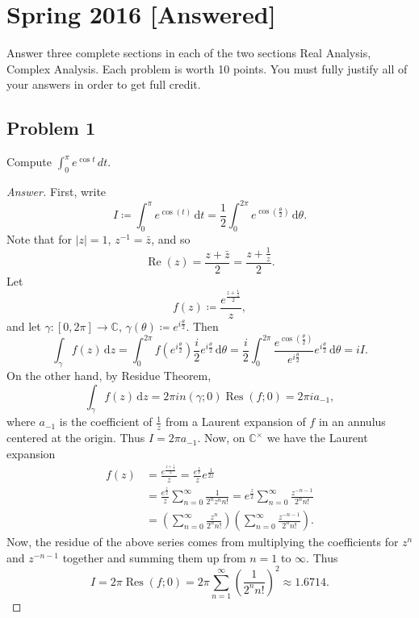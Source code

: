 \documentclass[12pt]{article}
\newcommand{\cx}{\mathbb{C}}
\newcommand\inv[1]{#1^{-1}}
\newcommand\paren[1]{\left( #1 \right)}
\newcommand{\abs}[1]{\left| #1 \right|}
\renewcommand{\i}[4]{\int_{#1}^{#2} {#3} \, \mathrm{d} {#4} }
\theoremstyle{definition}
\DeclareMathOperator\Res{Res}
\DeclareMathOperator\re{Re}
\begin{document}
\newpage
\section{Spring 2016 [Answered]}
Answer three complete sections in each of the two sections Real Analysis, Complex Analysis. Each problem is worth 10 points. You must fully justify all of your answers in order to get full credit. 

\subsection{Problem 1 \texorpdfstring{\cite{Israel}}{}}
Compute $\int_0^{\pi} e^{\cos t} \, dt$. 
\begin{proof}[Answer]
    First, write 
    \[
        I \coloneqq \i{0}{\pi}{e^{\cos(t)}}{t} = \frac{1}{2} \i{0}{2\pi}{ e^{ \cos \paren{ \frac{\theta}{2} } } }{\theta} . 
    \]
    Note that for $\abs{z} = 1$, $\inv{z} = \bar{z}$, and so 
    \[
        \re(z) = \frac{z + \bar{z}}{2} = \frac{z + \frac{1}{z}}{2} . 
    \]
    Let 
    \[
        f(z) \coloneqq \frac{ e^{ \frac{z + \frac{1}{z}}{2} } }{z} , 
    \]
    and let $\gamma : [0,2\pi] \to \cx$, $\gamma(\theta) \coloneqq e^{i\frac{\theta}{2}}$. Then 
    \[
        \i{\gamma}{}{f(z)}{z} = \i{0}{2\pi}{ f \paren{ e^{i\frac{\theta}{2}} } \frac{i}{2} e^{i\frac{\theta}{2}} }{\theta} = \frac{i}{2} \i{0}{2\pi}{ \frac{ e^{\cos \paren{ \frac{\theta}{2} } } }{e^{i\frac{\theta}{2}}} e^{i\frac{\theta}{2}} }{\theta} = i I. 
    \]
    On the other hand, by Residue Theorem, 
    \[
        \i{\gamma}{}{f(z)}{z} = 2\pi i n(\gamma;0) \Res(f;0) = 2\pi i a_{-1} , 
    \]
    where $a_{-1}$ is the coefficient of $\frac{1}{z}$ from a Laurent expansion of $f$ in an annulus centered at the origin. Thus $I = 2\pi a_{-1}$. Now, on $\cx^{\times}$ we have the Laurent expansion 
    \begin{align*}
        f(z) & = \frac{ e^{ \frac{z + \frac{1}{z}}{2} } }{z} = \frac{e^{\frac{z}{2}}}{z} e^{\frac{1}{2z}} \\ 
        & = \frac{e^{\frac{z}{2}}}{z} \sum\limits_{n = 0}^{\infty} \frac{1}{2^n z^n n!} = e^{\frac{z}{2}} \sum\limits_{n = 0}^{\infty} \frac{z^{-n-1}}{2^n n!} \\ 
        & = \paren{ \sum\limits_{n = 0}^{\infty} \frac{z^n}{2^n n!} } \paren{ \sum\limits_{n = 0}^{\infty} \frac{z^{-n-1}}{2^n n!} } . 
    \end{align*}
    Now, the residue of the above series comes from multiplying the coefficients for $z^n$ and $z^{-n-1}$ together and summing them up from $n = 1$ to $\infty$. Thus 
    \[
        I = 2\pi \Res(f;0) = 2\pi \sum\limits_{n = 1}^{\infty} \paren{ \frac{1}{2^n n!} }^2 \approx 1.6714. 
    \]
\end{proof}
\end{document}
